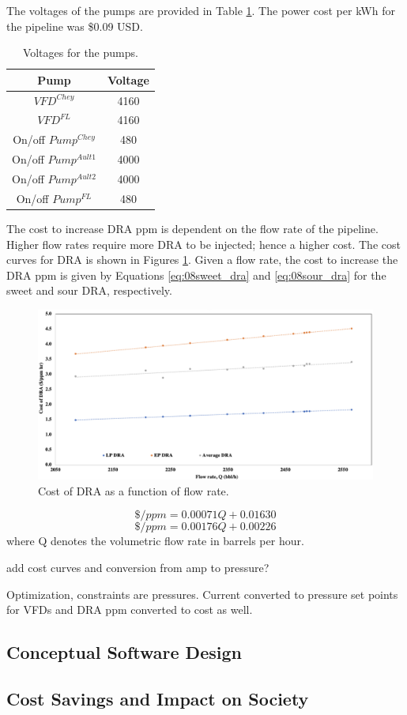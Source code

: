 The voltages of the pumps are provided in Table \ref{tab:08Voltages}.  The power cost per kWh for the pipeline was \$0.09 USD.
\begin{table}[h]
    \centering
    {
    \begin{tabular}{c|c}
        Pump          &  Voltage \\
        \hline
        $VFD^{Chey}$    &  4160    \\
        $VFD^{FL}$      &  4160    \\
        On/off $Pump^{Chey}$    & 480   \\
        On/off $Pump^{Ault1}$   & 4000  \\
        On/off $Pump^{Ault2}$   & 4000  \\
        On/off $Pump^{FL}$      & 480   \\
    \end{tabular}}
    \caption{Voltages for the pumps.}
    \label{tab:08Voltages}
\end{table}

The cost to increase DRA ppm is dependent on the flow rate of the pipeline. Higher flow rates require more DRA to be injected; hence a higher cost.  The cost curves for DRA is shown in Figures \ref{fig:08DRA_Cost}.  Given a flow rate, the cost to increase the DRA ppm is given by Equations \ref{eq:08sweet_dra} and \ref{eq:08sour_dra} for the sweet and sour DRA, respectively.

\begin{figure}[h]
    \centering
    \includegraphics[width=\textwidth]{images/08DRA_Cost.png}
    \caption{Cost of DRA as a function of flow rate.}
    \label{fig:08DRA_Cost}
\end{figure}

\begin{equation}
    \$ / ppm = 0.00071Q + 0.01630
    \label{eq:08sweet_dra}
\end{equation}
\begin{equation}
    \$ / ppm = 0.00176Q + 0.00226
    \label{eq:08sour_dra}
\end{equation}
where Q denotes the volumetric flow rate in barrels per hour.

add cost curves and conversion from amp to pressure?

Optimization, constraints are pressures.  Current converted to pressure set points for VFDs and DRA ppm converted to cost as well.
\subsection{Conceptual Software Design}
\subsection{Cost Savings and Impact on Society}
